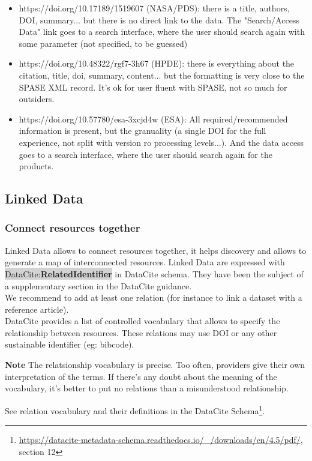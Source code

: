 \documentclass[11pt,a4paper]{ivoa}
\newcommand{\dataciteterm}[1]{\colorbox{lightgray}{DataCite:\textbf{#1}}}
\newcommand{\important}[1]{
	\begin{bigdescription}
		\item \color{ivoacolor}\textbf{Note} #1
	\end{bigdescription}
}
\begin{document}
\begin{itemize}
    \item https://doi.org/10.17189/1519607 (NASA/PDS): there is a title, authors, DOI, summary... but there is no direct link to the data. The "Search/Access Data" link goes to a search interface, where the user should search again with some parameter (not specified, to be guessed)
    \item https://doi.org/10.48322/rgf7-3h67 (HPDE): there is everything about the citation, title, doi, summary, content... but the formatting is very close to the SPASE XML record. It's ok for user fluent with SPASE, not so much for outsiders.
    \item https://doi.org/10.57780/esa-3xcjd4w (ESA): All required/recommended information is present, but the granuality (a single DOI for the full experience, not split with version ro processing levels...). And the data access goes to a search interface, where the user should search again for the products.
\end{itemize}


\subsection{Linked Data}
\label{sec:linkeddata}
\subsubsection{Connect resources together}
Linked Data allows to connect resources together, it helps discovery and allows to generate a map of interconnected resources. 
Linked Data are expressed with \dataciteterm{RelatedIdentifier} in DataCite schema. They have been the subject of a supplementary section in the DataCite guidance.\\

We recommend to add at least one relation (for instance to link a dataset with a reference article).\\


DataCite provides a list of controlled vocabulary that allows to specify the relationship between resources.
These relations may use DOI or any other sustainable identifier (eg: bibcode).

\important{	
The relatsionship vocabulary is precise.
Too often, providers give their own interpretation of the terms.
If there's any doubt about the meaning of the vocabulary,
it's better to put no relations than a misunderstood relationship.
}

See relation vocabulary and their definitions in the DataCite Schema\footnote{\url{https://datacite-metadata-schema.readthedocs.io/_/downloads/en/4.5/pdf/}, section 12}.
\end{document}
